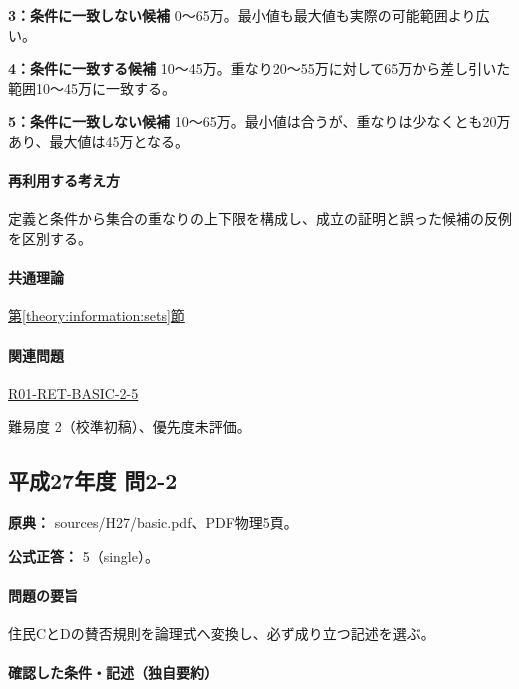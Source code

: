 \noindent\textbf{3：条件に一致しない候補} 0〜65万。最小値も最大値も実際の可能範囲より広い。\par

\noindent\textbf{4：条件に一致する候補} 10〜45万。重なり20〜55万に対して65万から差し引いた範囲10〜45万に一致する。\par

\noindent\textbf{5：条件に一致しない候補} 10〜65万。最小値は合うが、重なりは少なくとも20万あり、最大値は45万となる。\par

\paragraph{再利用する考え方} 定義と条件から集合の重なりの上下限を構成し、成立の証明と誤った候補の反例を区別する。

\paragraph{共通理論} \hyperref[theory:information:sets]{第\ref*{theory:information:sets}節}

\paragraph{関連問題} \hyperref[q:r01-ret-basic-2-5]{R01-RET-BASIC-2-5}

\par 難易度 2（校準初稿）、優先度未評価。

\subsection{平成27年度 問2-2}
\label{q:h27-reg-basic-2-2}

\noindent\textbf{原典：} sources/H27/basic.pdf、PDF物理5頁。

\textbf{公式正答：} 5（single）。

\paragraph{問題の要旨} 住民CとDの賛否規則を論理式へ変換し、必ず成り立つ記述を選ぶ。

\paragraph{確認した条件・記述（独自要約）}\mbox{}\par

